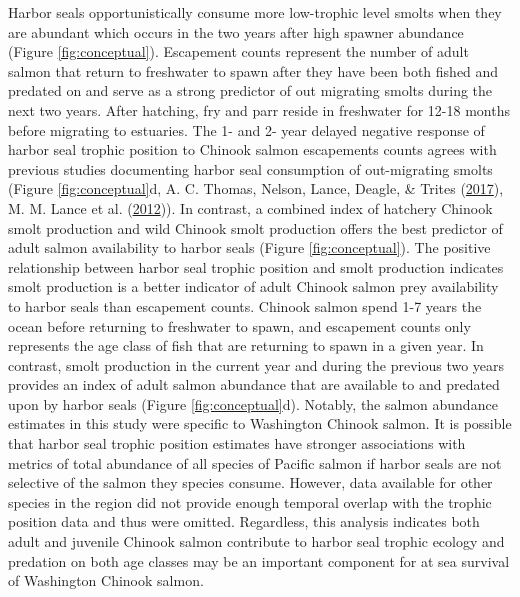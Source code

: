 \documentclass [11pt, proquest] {uwthesis}[2015/03/03]
\begin{document}
Harbor seals opportunistically consume more low-trophic level smolts
when they are abundant which occurs in the two years after high spawner
abundance (Figure \ref{fig:conceptual}). Escapement counts represent the
number of adult salmon that return to freshwater to spawn after they
have been both fished and predated on and serve as a strong predictor of
out migrating smolts during the next two years. After hatching, fry and
parr reside in freshwater for 12-18 months before migrating to
estuaries. The 1- and 2- year delayed negative response of harbor seal
trophic position to Chinook salmon escapements counts agrees with
previous studies documenting harbor seal consumption of out-migrating
smolts (Figure \ref{fig:conceptual}d, A. C. Thomas, Nelson, Lance,
Deagle, \& Trites (\protect\hyperlink{ref-Thomas2017}{2017}), M. M.
Lance et al. (\protect\hyperlink{ref-Lance2012}{2012})). In contrast, a
combined index of hatchery Chinook smolt production and wild Chinook
smolt production offers the best predictor of adult salmon availability
to harbor seals (Figure \ref{fig:conceptual}). The positive relationship
between harbor seal trophic position and smolt production indicates
smolt production is a better indicator of adult Chinook salmon prey
availability to harbor seals than escapement counts. Chinook salmon
spend 1-7 years the ocean before returning to freshwater to spawn, and
escapement counts only represents the age class of fish that are
returning to spawn in a given year. In contrast, smolt production in the
current year and during the previous two years provides an index of
adult salmon abundance that are available to and predated upon by harbor
seals (Figure \ref{fig:conceptual}d). Notably, the salmon abundance
estimates in this study were specific to Washington Chinook salmon. It
is possible that harbor seal trophic position estimates have stronger
associations with metrics of total abundance of all species of Pacific
salmon if harbor seals are not selective of the salmon they species
consume. However, data available for other species in the region did not
provide enough temporal overlap with the trophic position data and thus
were omitted. Regardless, this analysis indicates both adult and
juvenile Chinook salmon contribute to harbor seal trophic ecology and
predation on both age classes may be an important component for at sea
survival of Washington Chinook salmon.
\end{document}
